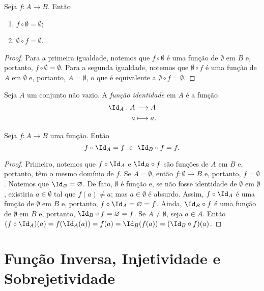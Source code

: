 \begin{prop}
	Seja $f: A \to B$. Então
	\begin{enumerate}
	\item $f \circ \emptyset = \emptyset$;
	\item $\emptyset \circ f = \emptyset$.
	\end{enumerate}
\end{prop}
\begin{proof}
	Para a primeira igualdade, notemos que $f \circ \emptyset$ é uma função de $\emptyset$ em $B$ e, portanto, $f \circ \emptyset=\emptyset$. Para a segunda igualdade, notemos que $\emptyset \circ f$ é uma função de $A$ em $\emptyset$ e, portanto, $A=\emptyset$, o que é equivalente a $\emptyset \circ f=\emptyset$.
\end{proof}

\begin{defi}
	Seja $A$ um conjunto não vazio. A \emph{função identidade} em $A$ é a função
	\begin{align*}
	\func{\Id_A}{A}{A}{a}{a}.
	\end{align*}
\end{defi}

\begin{prop}
\label{prop:id.comp.func}
	Seja $f: A \to B$ uma função. Então
	\begin{equation*}
	f \circ \Id_A = f \e \Id_B \circ f = f.
	\end{equation*}
\end{prop}
\begin{proof}
	Primeiro, notemos que $f \circ \Id_A$ e $\Id_B \circ f$ são funções de $A$ em $B$ e, portanto, têm o mesmo domínio de $f$. Se $A = \emptyset$, então $f: \emptyset \to B$ e, portanto, $f=\emptyset$. Notemos que $\Id_\emptyset = \emptyset$. De fato, $\emptyset$ é função e, se não fosse identidade de $\emptyset$ em $\emptyset$, existiria $a \in \emptyset$ tal que $f(a) \neq a$; mas $a \in \emptyset$ é absurdo. Assim, $f \circ \Id_A$ é uma função de $\emptyset$ em $B$ e, portanto, $f \circ \Id_A = \emptyset = f$. Ainda, $\Id_B \circ f$ é uma função de $\emptyset$ em $B$ e, portanto, $\Id_B \circ f = \emptyset = f$. Se $A \neq \emptyset$, seja $a \in A$. Então $(f \circ \Id_A) (a) = f(\Id_A(a)) = f(a) = \Id_B(f(a)) = (\Id_B \circ f)(a)$.
\end{proof}

\section{Função Inversa, Injetividade e Sobrejetividade}

